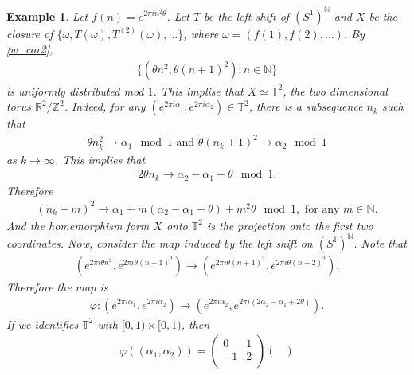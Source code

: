 \documentclass[a4paper,10pt]{amsart}
\newtheorem{example}{Example}[section]
\newcommand{\R}{\mathbb R}  %
\newcommand{\Z}{\mathbb Z} %
\newcommand{\N}{\mathbb N} %
\newcommand{\T}{\mathbb T} %
\begin{document}
\begin{example}
    Let $f(n) = e^{2\pi i n^2\theta}$. Let $T$ be the left shift of 
    $(S^{1})^{\N}$ and $X$ be the closure of $\{\omega, T(\omega),
    T^{(2)}(\omega), \ldots \}$, where 
    $\omega = (f(1), f(2), \ldots)$. By \cref{w_cor2}, 
    \begin{align*}
        \{(\theta n^{2}, \theta (n+1)^{2}) : n \in \N\} 
    \end{align*}
    is uniformly distributed mod $1$. This implise that 
    $X \simeq \T^{2}$, the two dimensional torus $\R^{2}/\Z^{2}$.
    Indeed, for any $(e^{2\pi i \alpha_{1}}, e^{2\pi i \alpha_{2}}) \in 
    \T^{2}$, there is a subsequence $n_{k}$ such that
    \begin{align*}
        \theta n_{k}^{2} \to \alpha_1 \mod 1 
        \mbox{ and } \theta (n_k + 1)^{2}  
    \to \alpha_2 \mod 1 
    \end{align*}
    as $k \to \infty$. This implies that 
    \begin{align*}
        2\theta n_{k} \to \alpha_2 -\alpha_1 - \theta \mod 1. 
    \end{align*}
    Therefore
    \begin{align*}
        (n_{k} + m)^{2} \to \alpha_1 + m(\alpha_2-\alpha_1 -\theta) 
        + m^{2}\theta \mod 1, \mbox{ for any }  m \in \N. 
    \end{align*}
    And the homemorphism form $X$ onto $\T^{2}$ is the 
    projection onto the first two coordinates.
    Now, consider the map induced by the left shift on $(S^{1})^{\N}$.
    Note that
    \begin{align*}
        (e^{2\pi i \theta n^{2}}, e^{2\pi i \theta (n+1)^{2}}) \to
        (e^{2\pi i \theta (n+1)^{2}}, e^{2\pi i \theta (n+2)^{2}}).  
    \end{align*}
    Therefore the map is
    \begin{align*}
        \varphi: (e^{2\pi i \alpha_1}, e^{2\pi i \alpha_2}) \to
        (e^{2\pi i \alpha_2}, e^{2\pi i (2\alpha_2 - \alpha_1 + 2\theta)}).
    \end{align*}
    If we identifies $\T^{2}$ with 
    $[0, 1) \times [0, 1)$, then
    \begin{align*}
        \varphi((\alpha_1, \alpha_2)) = 
        \begin{pmatrix}
            0 & 1 \\
            -1 & 2\\
        \end{pmatrix}
        \begin{pmatrix}

\end{pmatrix}
\end{align*}
\end{example}
\end{document}
